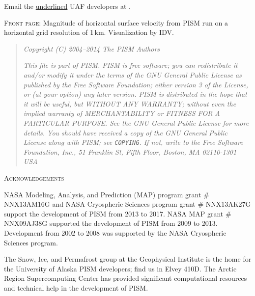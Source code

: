 \documentclass[titlepage,letterpaper,final]{scrartcl}
\begin{document}
\bigskip
\noindent Email the \underline{underlined} UAF developers at \qquad \PISMEMAIL.

\bigskip\bigskip
\noindent \textsc{Front page}:  Magnitude of horizontal surface velocity from PISM run on a horizontal grid resolution of 1\,km.  Visualization by IDV.

\vfill

\newpage
\vspace{0.2in}
\begin{quote}
\textsl{Copyright (C) 2004--2014 The PISM Authors}
\medskip

\noindent \textsl{This file is part of PISM.  PISM is free software; you can redistribute it and/or modify it under the terms of the GNU General Public License as published by the Free Software Foundation; either version 3 of the License, or (at your option) any later version.  PISM is distributed in the hope that it will be useful, but WITHOUT ANY WARRANTY; without even the implied warranty of MERCHANTABILITY or FITNESS FOR A PARTICULAR PURPOSE.  See the GNU General Public License for more details.  You should have received a copy of the GNU General Public License along with PISM; see \emph{\texttt{COPYING}}.  If not, write to the Free Software Foundation, Inc., 51 Franklin St, Fifth Floor, Boston, MA  02110-1301 USA}
\end{quote}
\vspace{0.5in}

\centerline{\textsc{Acknowledgements}}
\bigskip

\small
NASA Modeling, Analysis, and Prediction (MAP) program grant \# NNX13AM16G and NASA Cryospheric Sciences program grant \# NNX13AK27G support the development of PISM from 2013 to 2017.  NASA MAP grant \# NNX09AJ38G supported the development of PISM from 2009 to 2013.  Development from 2002 to 2008 was supported by the NASA Cryospheric Sciences program.

The Snow, Ice, and Permafrost group at the Geophysical Institute is the home for the University of Alaska PISM developers; find us in Elvey 410D.  The Arctic Region Supercomputing Center has provided significant computational resources and technical help in the development of PISM.
\end{document}
